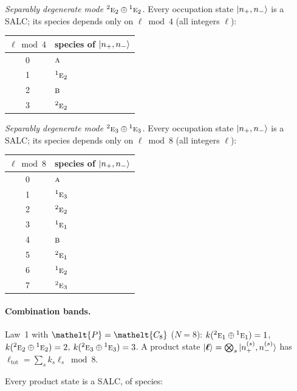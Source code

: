 \documentclass[11pt]{article}
\newcommand{\eltfont}[1]{{\let\sigma\eltsigma\mathelt{#1}}}
\newcommand{\irr}[1]{\text{\normalfont\scshape #1}}
\newcommand{\conjpair}[1]{{}^{#1}}
\newcommand{\elt}[1]{\eltfont{#1}}
\newcommand{\pel}{\elt{P}}             %
\begin{document}
\emph{Separably degenerate mode $\conjpair{2}\irr{e}_{2}\oplus \conjpair{1}\irr{e}_{2}$.} Every occupation state $\ket{n_+,n_-}$ is a SALC; its species depends only on $\ell\bmod 4$ (all integers $\ell$):
\begin{longtable}{c l}\hline $\ell\bmod 4$ & species of $\ket{n_+,n_-}$\\ \hline\endhead
0 & $\irr{a}$\\
1 & $\conjpair{1}\irr{e}_{2}$\\
2 & $\irr{b}$\\
3 & $\conjpair{2}\irr{e}_{2}$\\
\hline\end{longtable}

\emph{Separably degenerate mode $\conjpair{2}\irr{e}_{3}\oplus \conjpair{1}\irr{e}_{3}$.} Every occupation state $\ket{n_+,n_-}$ is a SALC; its species depends only on $\ell\bmod 8$ (all integers $\ell$):
\begin{longtable}{c l}\hline $\ell\bmod 8$ & species of $\ket{n_+,n_-}$\\ \hline\endhead
0 & $\irr{a}$\\
1 & $\conjpair{1}\irr{e}_{3}$\\
2 & $\conjpair{2}\irr{e}_{2}$\\
3 & $\conjpair{1}\irr{e}_{1}$\\
4 & $\irr{b}$\\
5 & $\conjpair{2}\irr{e}_{1}$\\
6 & $\conjpair{1}\irr{e}_{2}$\\
7 & $\conjpair{2}\irr{e}_{3}$\\
\hline\end{longtable}

\paragraph{Combination bands.}

Law~1 with $\pel=\elt{C_{8}}$ ($N=8$): $k(\conjpair{2}\irr{e}_{1}\oplus \conjpair{1}\irr{e}_{1})=1$, $k(\conjpair{2}\irr{e}_{2}\oplus \conjpair{1}\irr{e}_{2})=2$, $k(\conjpair{2}\irr{e}_{3}\oplus \conjpair{1}\irr{e}_{3})=3$. A product state $\ket{\boldsymbol\ell}=\bigotimes_s\ket{n_+^{(s)},n_-^{(s)}}$ has $\ell_{\mathrm{tot}}=\sum_sk_s\ell_s\bmod 8$.

Every product state is a SALC, of species:
\end{document}
